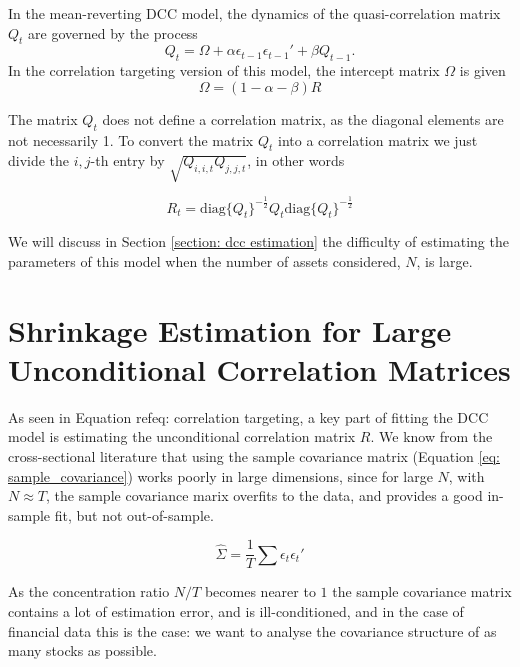 \documentclass{article} %
\numberwithin{equation}{section} %
\numberwithin{figure}{section} %
\numberwithin{table}{section} %
\begin{document}
In the mean-reverting DCC model, the dynamics of the quasi-correlation matrix $Q_t$ are governed by the process
\begin{equation}
  Q_t = \Omega + \alpha \epsilon_{t-1}\epsilon_{t-1}' + \beta Q_{t-1}.
\end{equation}
In the correlation targeting version of this model, the intercept matrix $\Omega$ is given
\begin{equation}\label{eq: correlation targeting}
  \Omega = (1 - \alpha - \beta)R
\end{equation}

The matrix $Q_t$ does not define a correlation matrix, as the diagonal elements are not necessarily 1. To convert the matrix $Q_t$ into a correlation matrix we just divide the $i,j$-th entry by $\sqrt{Q_{i,i,t}Q_{j,j,t}}$, in other words

\begin{equation}
  R_t = \text{diag}\{Q_t\}^{-\frac{1}{2}} Q_t \text{diag}\{Q_t\}^{-\frac{1}{2}}
\end{equation}

We will discuss in Section \ref{section: dcc estimation} the difficulty of estimating the parameters of this model when the number of assets considered, $N$, is large.


\section{Shrinkage Estimation for Large Unconditional Correlation Matrices}\label{section: shrinkage}

As seen in Equation ref{eq: correlation targeting}, a key part of fitting the DCC model is estimating the unconditional correlation matrix $R$. We know from the cross-sectional literature that using the sample covariance matrix (Equation \ref{eq: sample_covariance}) works poorly in large dimensions, since for large $N$, with $N \approx T$, the sample covariance marix overfits to the data, and provides a good in-sample fit, but not out-of-sample.

\begin{equation} \label{eq: sample_covariance}
\hat{\Sigma} = \frac{1}{T} \sum \epsilon_t \epsilon_t'
\end{equation}

As the concentration ratio $N/T$ becomes nearer to $1$ the sample covariance matrix contains a lot of estimation error, and is ill-conditioned, and in the case of financial data this is the case: we want to analyse the covariance structure of as many stocks as possible.
\end{document}
